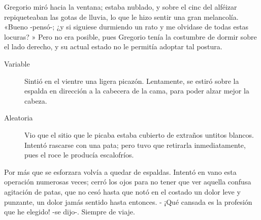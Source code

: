 Gregorio miró hacia la ventana; estaba nublado, y sobre el cinc del alféizar repiqueteaban las gotas de lluvia, lo que le hizo sentir una gran melancolía. «Bueno -pensó-; ¿y si siguiese durmiendo un rato y me olvidase de todas estas locuras? » Pero no era posible, pues Gregorio tenía la costumbre de dormir sobre el lado derecho, y su actual estado no le permitía adoptar tal postura. 

\begin{description}
	\item[Variable] Sintió en el vientre una ligera picazón. Lentamente, se estiró sobre la espalda en dirección a la cabecera de la cama, para poder alzar mejor la cabeza.
	\item[Aleatoria]  Vio que el sitio que le picaba estaba cubierto de extraños untitos blancos. Intentó rascarse con una pata; pero tuvo que retirarla inmediatamente, pues el roce le producía escalofríos.
\end{description}

Por más que se esforzara volvía a quedar de espaldas. Intentó en vano esta operación numerosas veces; cerró los ojos para no tener que ver aquella confusa agitación de patas, que no cesó hasta que notó en el costado un dolor leve y punzante, un dolor jamás sentido hasta entonces. - ¡Qué cansada es la profesión que he elegido! -se dijo-. Siempre de viaje. 
